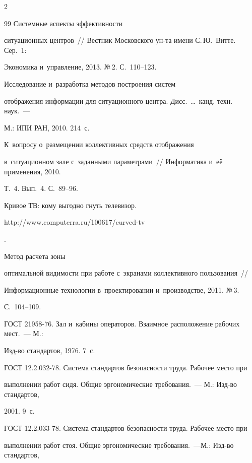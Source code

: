 \begin{multicols}{2}
{{\begin{thebibliography}{99}
 Системные аспекты эффективности

ситуационных центров~// Вестник Московского ун-та имени С.\,Ю.~Витте. Сер.~1:

Экономика и~управление, 2013. №\,2. С.~110--123.


 Исследование и~разработка методов построения систем

отображения информации для ситуационного центра. Дисс.\ \ldots\ канд. техн. наук.~---

М.: ИПИ РАН, 2010. 214~с.


 К~вопросу о~размещении коллективных средств отображения

в~ситуационном зале с~заданными параметрами~// Информатика и~её применения, 2010.

Т.~4. Вып.~4. С.~89--96.


 Кривое ТВ: кому выгодно гнуть телевизор. {\sf

http://www.computerra.ru/100617/curved-tv}.


 Метод расчета зоны

оптимальной видимости при работе с~экранами коллективного пользования~//

Информационные технологии в~проектировании и~производстве, 2011. №\,3.

С.~104--109.




ГОСТ 21958-76. Зал и~кабины операторов. Взаимное расположение рабочих мест.~--- М.:

Изд-во стандартов, 1976. 7~с.


ГОСТ 12.2.032-78. Система стандартов безопасности труда. Рабочее место при

выполнении работ сидя. Общие эргономические требования.~--- М.: Изд-во стандартов,

2001. 9~с.


ГОСТ 12.2.033-78. Система стандартов безопасности труда. Рабочее место при

выполнении работ стоя. Общие эргономические требования.~---М.: Изд-во стандартов,


\end{thebibliography}}}
\end{multicols}
